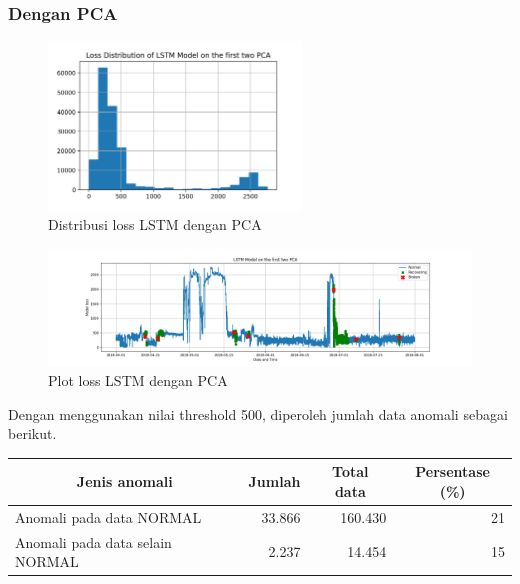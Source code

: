     \subsubsection{Dengan PCA}

    \begin{figure}[h]
        \centering
        \includegraphics[width=0.6\textwidth]{resources/LSTM/LSTM_PCA_LossDist.png}
        \caption{Distribusi loss LSTM dengan PCA}
    \end{figure}

    \begin{figure}[h]
        \centerline{\includegraphics[width=1.4\textwidth]{resources/LSTM/LSTM_PCA_model_loss.png}}
        \caption{Plot loss LSTM dengan PCA}
    \end{figure}

    Dengan menggunakan nilai threshold 500, diperoleh jumlah data anomali sebagai berikut.

    \begin{table}[h]
        \centering
        \begin{tabular}{|l|r|r|r|}
            \hline
            \multicolumn{1}{|c|}{\textbf{Jenis anomali}} & \multicolumn{1}{c|}{\textbf{Jumlah}} & \multicolumn{1}{c|}{\textbf{Total data}} & \multicolumn{1}{c|}{\textbf{Persentase (\%)}} \\ \hline
            Anomali pada data NORMAL                     & 33.866                                & 160.430                                   & 21                                       \\ \hline
            Anomali pada data selain NORMAL              & 2.237                                 & 14.454                                    & 15                                       \\ \hline
        \end{tabular}
    \end{table}

